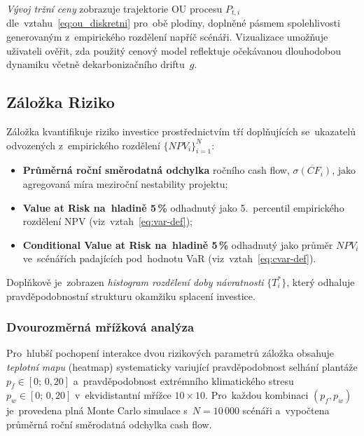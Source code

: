 \emph{Vývoj tržní ceny} zobrazuje trajektorie OU procesu $P_{t,i}$
dle~vztahu~\eqref{eq:ou_diskretni} pro~obě plodiny, doplněné pásmem
spolehlivosti generovaným z~empirického rozdělení napříč scénáři.
Vizualizace umožňuje uživateli ověřit, zda použitý cenový model
reflektuje očekávanou dlouhodobou dynamiku včetně dekarbonizačního
driftu~$g$.

\subsection{Záložka Riziko}
\label{sec:vystupy_riziko}

Záložka kvantifikuje riziko investice prostřednictvím tří doplňujících
se~ukazatelů odvozených z~empirického rozdělení $\{NPV_i\}_{i=1}^{N}$:
\begin{itemize}
    \item \textbf{Průměrná roční směrodatná odchylka} ročního cash flow,
          $\overline{\sigma(CF_i)}$, jako agregovaná míra meziroční
          nestability projektu;
    \item \textbf{Value at Risk na~hladině 5\,\%} odhadnutý jako
          5.~percentil empirického rozdělení NPV (viz~vztah~\eqref{eq:var-def});
    \item \textbf{Conditional Value at Risk na~hladině 5\,\%}
          odhadnutý jako průměr $NPV_i$ ve~scénářích padajících
          pod~hodnotu VaR (viz~vztah~\eqref{eq:cvar-def}).
\end{itemize}
Doplňkově je~zobrazen \emph{histogram rozdělení doby návratnosti}
$\{T^*_i\}$, který odhaluje pravděpodobnostní strukturu okamžiku
splacení investice.

\subsubsection{Dvourozměrná mřížková analýza}
\label{sec:citlivost_grid}

Pro~hlubší pochopení interakce dvou rizikových parametrů
záložka obsahuje \emph{teplotní mapu} (heatmap) systematicky variující
pravděpodobnost selhání plantáže $p_f \in [0;\, 0{,}20]$
a~pravděpodobnost extrémního klimatického stresu $p_w \in [0;\, 0{,}20]$
v~ekvidistantní mřížce $10 \times 10$. Pro~každou kombinaci $(p_f, p_w)$
je~provedena plná Monte Carlo simulace s~$N = 10\,000$ scénáři
a~vypočtena průměrná roční směrodatná odchylka cash flow. 

